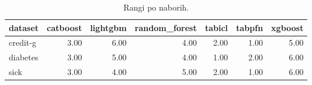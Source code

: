 \begin{table}[htbp]
\centering
\caption{Rangi po naborih.}
\label{tab:ranks}
\begin{tabular}{lrrrrrr}
\hline
dataset & catboost & lightgbm & random\_forest & tabicl & tabpfn & xgboost \\
\hline
credit-g & 3.00 & 6.00 & 4.00 & 2.00 & 1.00 & 5.00 \\
diabetes & 3.00 & 5.00 & 4.00 & 1.00 & 2.00 & 6.00 \\
sick & 3.00 & 4.00 & 5.00 & 2.00 & 1.00 & 6.00 \\
\hline
\end{tabular}
\end{table}
